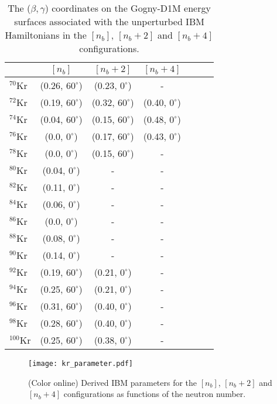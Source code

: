 \documentclass[twocolumn,showpacs,amsmath,amssymb,superscriptaddress]{revtex4-1}
\begin{document}
\begin{table}[htb]
\caption{\label{tab:config}
The ($\beta,\gamma$) coordinates on 
the Gogny-D1M energy surfaces associated with the unperturbed
IBM Hamiltonians in the $[n_b]$, $[n_b+2]$ and $[n_b+4]$ configurations.}
\begin{center}
\begin{tabular}{lcccccc}
\hline\hline
          & $[n_b]$ & $[n_b+2]$ & $[n_b+4]$ \\
\hline
$^{70}$Kr & (0.26, $60^{\circ}$) & (0.23, $0^{\circ}$) & - \\
$^{72}$Kr & (0.19, $60^{\circ}$) & (0.32, $60^{\circ}$) & (0.40,
	     $0^{\circ}$) \\
$^{74}$Kr & (0.04, $60^{\circ}$) & (0.15, $60^{\circ}$) & (0.48,
	     $0^{\circ}$) \\
$^{76}$Kr & (0.0, $0^{\circ}$) & (0.17, $60^{\circ}$) & (0.43,
	     $0^{\circ}$) \\
$^{78}$Kr & (0.0, $0^{\circ}$) & (0.15, $60^{\circ}$) & - \\
$^{80}$Kr & (0.04, $0^{\circ}$) & - & - \\
$^{82}$Kr & (0.11, $0^{\circ}$) & - & - \\
$^{84}$Kr & (0.06, $0^{\circ}$) & - & - \\
$^{86}$Kr & (0.0, $0^{\circ}$) & - & - \\
$^{88}$Kr & (0.08, $0^{\circ}$) & - & - \\
$^{90}$Kr & (0.14, $0^{\circ}$) & - & - \\
$^{92}$Kr & (0.19, $60^{\circ}$) & (0.21, $0^{\circ}$) & - \\
$^{94}$Kr & (0.25, $60^{\circ}$) & (0.21, $0^{\circ}$) & - \\
$^{96}$Kr & (0.31, $60^{\circ}$) & (0.40, $0^{\circ}$) & - \\
$^{98}$Kr & (0.28, $60^{\circ}$) & (0.40, $0^{\circ}$) & - \\
$^{100}$Kr & (0.25, $60^{\circ}$) & (0.38, $0^{\circ}$) & - \\
\hline\hline
\end{tabular}
\end{center}
\end{table}





\begin{figure}[htb!]
\begin{center}
\texttt{[image: kr\_parameter.pdf]}
\caption{(Color online) Derived IBM parameters for the
 $[n_b]$, $[n_b+2]$ and $[n_b+4]$ configurations as functions of 
the neutron number.}
\label{fig:para}
\end{center}
\end{figure}
\end{document}
